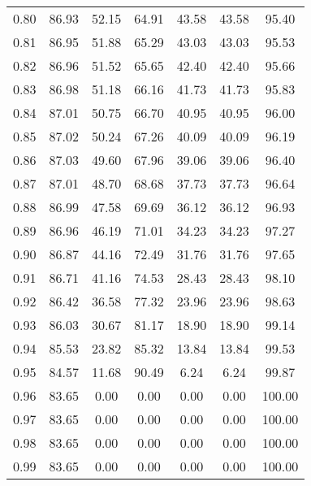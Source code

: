 \begin{tabular}{|c|c|c|c|c|c|c|}
      0.80 &     86.93 &     52.15 &      64.91 &   43.58 &      43.58 &         95.40 \\
      0.81 &     86.95 &     51.88 &      65.29 &   43.03 &      43.03 &         95.53 \\
      0.82 &     86.96 &     51.52 &      65.65 &   42.40 &      42.40 &         95.66 \\
      0.83 &     86.98 &     51.18 &      66.16 &   41.73 &      41.73 &         95.83 \\
      0.84 &     87.01 &     50.75 &      66.70 &   40.95 &      40.95 &         96.00 \\
      0.85 &     87.02 &     50.24 &      67.26 &   40.09 &      40.09 &         96.19 \\
      0.86 &     87.03 &     49.60 &      67.96 &   39.06 &      39.06 &         96.40 \\
      0.87 &     87.01 &     48.70 &      68.68 &   37.73 &      37.73 &         96.64 \\
      0.88 &     86.99 &     47.58 &      69.69 &   36.12 &      36.12 &         96.93 \\
      0.89 &     86.96 &     46.19 &      71.01 &   34.23 &      34.23 &         97.27 \\
      0.90 &     86.87 &     44.16 &      72.49 &   31.76 &      31.76 &         97.65 \\
      0.91 &     86.71 &     41.16 &      74.53 &   28.43 &      28.43 &         98.10 \\
      0.92 &     86.42 &     36.58 &      77.32 &   23.96 &      23.96 &         98.63 \\
      0.93 &     86.03 &     30.67 &      81.17 &   18.90 &      18.90 &         99.14 \\
      0.94 &     85.53 &     23.82 &      85.32 &   13.84 &      13.84 &         99.53 \\
      0.95 &     84.57 &     11.68 &      90.49 &    6.24 &       6.24 &         99.87 \\
      0.96 &     83.65 &      0.00 &       0.00 &    0.00 &       0.00 &        100.00 \\
      0.97 &     83.65 &      0.00 &       0.00 &    0.00 &       0.00 &        100.00 \\
      0.98 &     83.65 &      0.00 &       0.00 &    0.00 &       0.00 &        100.00 \\
      0.99 &     83.65 &      0.00 &       0.00 &    0.00 &       0.00 &        100.00 \\
\bottomrule
\end{tabular}
